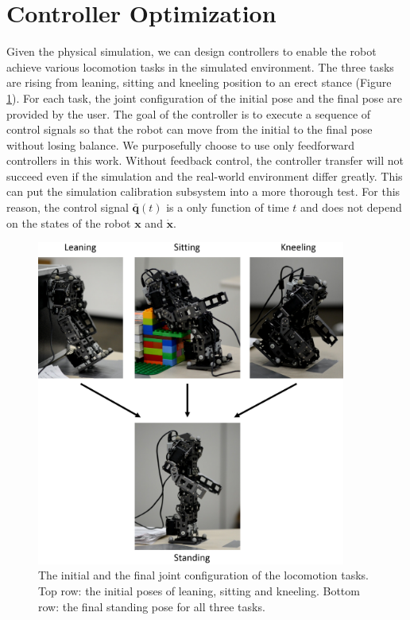 \section{Controller Optimization}

Given the physical simulation, we can design controllers to enable the robot achieve various locomotion tasks in the simulated environment. The three tasks are rising from leaning, sitting and kneeling position to an erect stance (Figure \ref{fig:task}). For each task, the joint configuration of the initial pose and the final pose are provided by the user. The goal of the controller is to execute a sequence of control signals so that the robot can move from the initial to the final pose without losing balance. We purposefully choose to use only feedforward controllers in this work. Without feedback control, the controller transfer will not succeed even if the simulation and the real-world environment differ greatly. This can put the simulation calibration subsystem into a more thorough test. For this reason, the control signal $\bar{\mathbf{q}}(t)$ is a only function of time $t$ and does not depend on the states of the robot $\mathbf{x}$ and $\dot{\mathbf{x}}$.

\begin{figure}[!t]
  \centering
  \includegraphics[width=4in]{figures/initialFinal}
  \caption{The initial and the final joint configuration of the locomotion tasks. Top row: the initial poses of leaning, sitting and kneeling. Bottom row: the final standing pose for all three tasks.}
  \label{fig:task}
\end{figure}


